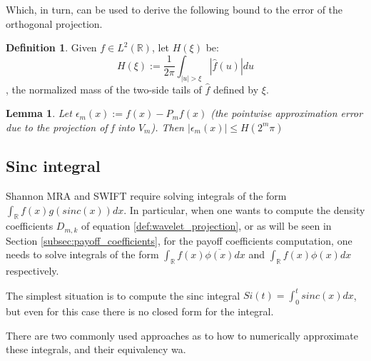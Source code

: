 \documentclass[12,twoside]{mammeTFM}
\newtheorem{lem}[thm]{Lemma}
\theoremstyle{definition}
\newtheorem{definition}[thm]{Definition}
\theoremstyle{remark}
\newcommand{\R}{\ensuremath{\mathbb{R}}}
\begin{document}
Which, in turn, can be used to derive the following bound to the error of the orthogonal projection.

\begin{definition}Given $f \in L^2(\R)$, let $H(\xi)$ be:
\begin{equation}
H(\xi) := \dfrac{1}{2 \pi} \int_{|u| > \xi}\left|\hat{f}(u)\right| du
\end{equation}
, the normalized mass of the two-side tails of $\hat{f}$ defined by $\xi$.
\end{definition}

\begin{lem} \label{lem:projection_error} Let $\epsilon_m(x) := f(x) - P_m f(x)$ (the pointwise approximation error due to the projection of f into $V_m$). Then $|\epsilon_m(x)| \leq H(2^m \pi)$ \cite{mar17}
\end{lem}


\subsection{Sinc integral}\label{sec:sinc_integral}
Shannon MRA and SWIFT require solving integrals of the form $\int_{\R} f(x) g(sinc(x)) dx$. In particular, when one wants to compute the density coefficients $D_{m,k}$ of equation \ref{def:wavelet_projection}, or as will be seen in Section \ref{subsec:payoff_coefficients}, for the payoff coefficients computation, one needs to solve integrals of the form $\int_{\R} f(x) \overline{\phi(x)} dx$ and $\int_{\R} f(x) \phi(x) dx$ respectively.

The simplest situation is to compute the sinc integral $Si(t) = \int_0^t{sinc(x) dx}$, but even for this case there is no closed form for the integral. 

There are two commonly used approaches as to how to numerically approximate these integrals, and their equivalency wa. 
\end{document}
